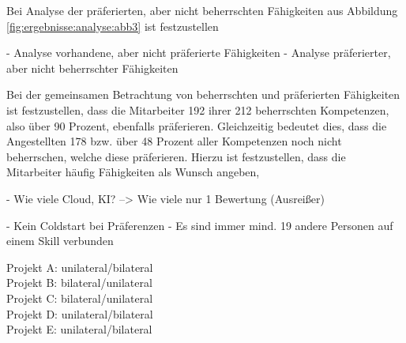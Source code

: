 Bei Analyse der präferierten, aber nicht beherrschten Fähigkeiten aus Abbildung \ref{fig:ergebnisse:analyse:abb3} ist festzustellen


\newpage

- Analyse vorhandene, aber nicht präferierte Fähigkeiten
- Analyse präferierter, aber nicht beherrschter Fähigkeiten

Bei der gemeinsamen Betrachtung von beherrschten und präferierten Fähigkeiten ist festzustellen, dass die Mitarbeiter 192 ihrer 212 beherrschten Kompetenzen, also über 90 Prozent, ebenfalls präferieren. Gleichzeitig bedeutet dies, dass die Angestellten 178 bzw. über 48 Prozent aller Kompetenzen noch nicht beherrschen, welche diese präferieren. Hierzu ist festzustellen, dass die Mitarbeiter häufig Fähigkeiten als Wunsch angeben, 

- Wie viele Cloud, KI? --> Wie viele nur 1 Bewertung (Ausreißer)


- Kein Coldstart bei Präferenzen
- Es sind immer mind. 19 andere Personen auf einem Skill verbunden

Projekt A: unilateral/bilateral\\
Projekt B: bilateral/unilateral\\
Projekt C: bilateral/unilateral\\
Projekt D: unilateral/bilateral\\
Projekt E: unilateral/bilateral

